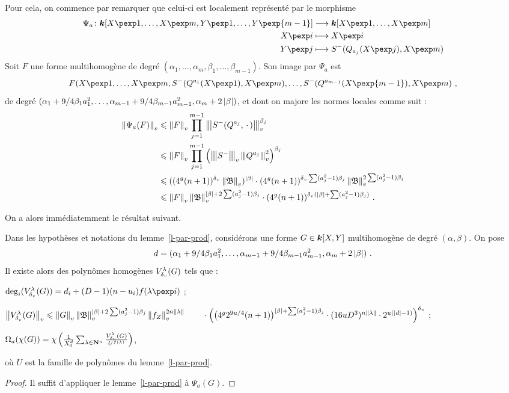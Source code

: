 \documentclass{mpg-preth}
\begin{document}
Pour cela, on commence par remarquer que celui-ci est localement
représenté par le morphisme
 \begin{align*}
   \Psi_a \colon \cdn[X\pexp1, \ldots, X\pexp m, Y\pexp1, \ldots, Y\pexp{m-1}]
   & \longrightarrow \cdn[X\pexp1, \ldots, X\pexp m] \\
   X\pexp i & \longmapsto X\pexp i \\
   Y\pexp j & \longmapsto S^-(Q_{a_j}(X\pexp j), X\pexp m) \\
 \end{align*}
Soit $F$ une forme multihomogène de degré $(\alpha_1, \ldots, \alpha_m,
\beta_1, \ldots, \beta_{m-1})$. Son image par $\Psi_a$ est
\[
  F(X\pexp1, \ldots, X\pexp m, S^-(Q^{a_1}(X\pexp 1), X\pexp m), \ldots,
  S^-(Q^{a_{m-1}}(X\pexp{m-1}), X\pexp m) \pmm,
\]
de degré $(\alpha_1 + 9/4 \beta_1 a_1^2, \ldots, \alpha_{m-1} + 9/4
\beta_{m-1} a_{m-1}^2, \alpha_m +2\left\lvert\beta\right\rvert)$, et dont on majore les normes
locales comme suit :
\begin{align*}
  \left\lVert\Psi_a(F)\right\rVert_{v}
  & \leqslant \left\lVert F\right\rVert_{v} \prod_{j=1}^{m-1} \left\lvert\hspace{-1pt}\left\lvert\hspace{-1pt} \left\lvert S^-(Q^{a_j}, {\,\cdot\,})\right\rvert \hspace{-1pt}\right\rvert\hspace{-1pt}\right\rvert_{v}^{\beta_j} \\
  & \leqslant \left\lVert F\right\rVert_{v} \prod_{j=1}^{m-1} \left( \left\lvert\hspace{-1pt}\left\lvert\hspace{-1pt} \left\lvert S^-\right\rvert \hspace{-1pt}\right\rvert\hspace{-1pt}\right\rvert_{v} \left\lvert\hspace{-1pt}\left\lvert\hspace{-1pt} \left\lvert Q^{a_j}\right\rvert \hspace{-1pt}\right\rvert\hspace{-1pt}\right\rvert_{v}^2
    \right)^{\beta_j} \\
  & \leqslant ((4^g(n+1))^{\delta\smash{_v}} \left\lVert\mathfrak{B}\right\rVert_{v})^{\left\lvert\beta\right\rvert} \cdot (4^g(n+1))^{{\delta\smash{_v}}\sum(a_j^2
      -1)\beta_j} \left\lVert\mathfrak{B}\right\rVert_{v}^{2\sum(a_j^2-1)\beta_j} \\
  & \leqslant \left\lVert F\right\rVert_{v} \left\lVert\mathfrak{B}\right\rVert_{v}^{\left\lvert\beta\right\rvert + 2\sum(a_j^2-1)\beta_j} \cdot
    (4^g(n+1))^{{\delta\smash{_v}}(\left\lvert\beta\right\rvert + \sum(a_j^2-1)\beta_j)} \text{ .}
\end{align*}

On a alors immédiatemment le résultat suivant.

\begin{lem}
  Dans les hypothèses et notations du lemme~\ref{l-par-prod}, considérons une
  forme $G \in \boldsymbol{k}[X, Y]$ multihomogène de degré $(\alpha, \beta)$. On pose
  \[ d = (\alpha_1 + 9/4 \beta_1 a_1^2, \ldots,
  \alpha_{m-1} + 9/4 \beta_{m-1} a_{m-1}^2, \alpha_m +2\left\lvert\beta\right\rvert) \text{ .} \]
  Il existe alors des polynômes homogènes $V^\lambda_{\delta\smash{_v}}(G)$ tels que :
  \begin{enumthm}
    \item $\deg_i(V_\dv^\lambda(G)) = d_i + (D-1)(n-u_i)f(\lambda\pexp i)$ ;
    \item $\nv{V_\dv^\lambda(G)} \le \nv G \nv\BA ^{\lgr\beta + 2\sum
      (a_j^2-1)\beta_j} \nv{f_Z}^{2n\lgt\lambda} \\ \null\qquad \cdot
      \Big( \big(4^g 2^{9u/4}(n+1)\big)^{\lgr\beta + \sum(a_j^2-1)\beta_j}
      \cdot (16uD^3)^{n\lgt\lambda} \cdot 2^{u(\lgr d -1)}
      \Big)^\dv$ ;
    \item $\Omega_a(\chi(G)) =\chi \left( \frac1{X_0^d} \sum_{\lambda \in \mathbf{N}^u}
      \frac {V_{\delta\smash{_v}}^\lambda(G)} {U^{f(\lambda)}} \right)$,
  \end{enumthm}
  où $U$ est la famille de polynômes du lemme~\ref{l-par-prod}.
\end{lem}

\begin{proof}
  Il suffit d'appliquer le lemme~\ref{l-par-prod} à $\Psi_a(G)$.
\end{proof}
\end{document}
